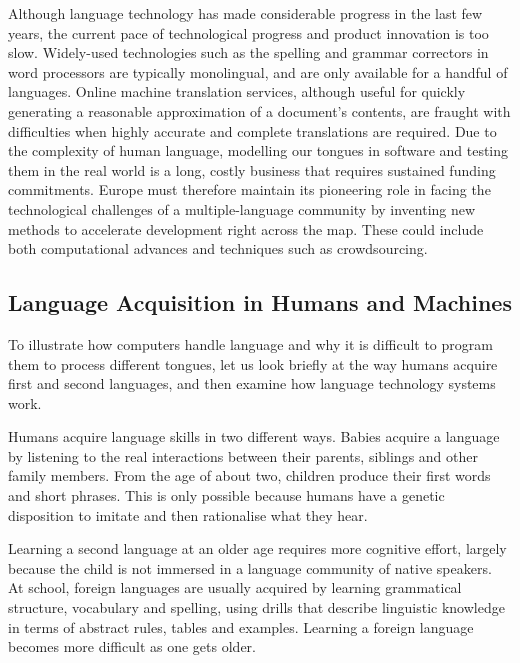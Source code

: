 \begin{multicols}{2}
Although language technology has made considerable progress in the last few years, the current pace of technological progress and product innovation is too slow. Widely-used technologies such as the spelling and grammar correctors in word processors are typically monolingual, and are only available for a handful of languages. Online machine translation services, although useful for quickly generating a reasonable approximation of a document’s contents, are fraught with difficulties when highly accurate and complete translations are required. Due to the complexity of human language, modelling our tongues in software and testing them in the real world is a long, costly business that requires sustained funding commitments. Europe must therefore maintain its pioneering role in facing the technological challenges of a multiple-language community by inventing new methods to accelerate development right across the map. These could include both computational advances and techniques such as crowdsourcing.


\subsection{Language Acquisition in Humans and Machines}

To illustrate how computers handle language and why it is difficult to program them to process different tongues, let us look briefly at the way humans acquire first and second languages, and then examine how language technology systems work.

Humans acquire language skills in two different ways. Babies acquire a language by listening to the real interactions between their parents, siblings and other family members. From the age of about two, children produce their first words and short phrases. This is only possible because humans have a genetic disposition to imitate and then rationalise what they hear. 

Learning a second language at an older age requires more cognitive effort, largely because the child is not immersed in a language community of native speakers. At school, foreign languages are usually acquired by learning grammatical structure, vocabulary and spelling, using drills that describe linguistic knowledge in terms of abstract rules, tables and examples. Learning a foreign language becomes more difficult as one gets older.


\end{multicols}
